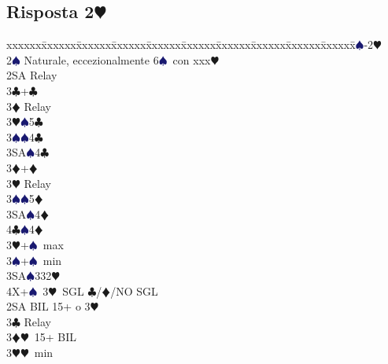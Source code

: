 \documentclass[a4paper,italian]{article}
\newcommand{\BC}{\textcolor{OliveGreen}{$\clubsuit$}}
\newcommand{\BD}{\textcolor{RedOrange}{$\vardiamondsuit$}}
\newcommand{\BH}{\textcolor{Red2}{$\varheartsuit${}}}
\newcommand{\BS}{\textcolor{MidnightBlue}{$\spadesuit${}}}
\newcommand{\pdfh}{\texorpdfstring{\BH{}}{H}}
\newenvironment{bidtable}
{\begin{tabbing}

    xxxxxx\=xxxxxx\=xxxxxx\=xxxxxx\=xxxxxx\=xxxxxx\=xxxxxx\=xxxxxx\=xxxxxx\=xxxxxx\=\kill}
{\end{tabbing} }%
\begin{document}
                                    \begin{multicols}{2}
                                        \subsection{Risposta 2\pdfh}
                                        \begin{bidtable}
                                            1\BS-2\BH\\
                                            2\BS\> Naturale, eccezionalmente 6\BS\ con xxx\BH\+\\
                                            2SA \> Relay\+\\
                                            3\BC{}+\BC\+\\
                                            3\BD\> Relay\+\\
                                            3\BH{}\BS5\BC\\
                                            3\BS{}\BS4\BC\\
                                            3SA\BS4\BC\-\-\\
                                            3\BD{}+\BD\+\\
                                            3\BH\> Relay\+\\
                                            3\BS{}\BS5\BD\\
                                            3SA\BS4\BD\\
                                            4\BC{}\BS4\BD\-\-\\
                                            3\BH{}+\BS\ max\\
                                            3\BS{}+\BS\ min\\
                                            3SA\BS332\BH\\
                                            4X+\BS\ 3\BH\ SGL \BC/\BD/NO SGL\-\-\\
                                            2SA\> BIL 15+ o 3\BH\+\\
                                            3\BC\> Relay\+\\
                                            3\BD{}\BH\ 15+ BIL\\
                                            3\BH{}\BH\ min\+\\

\end{bidtable}
\end{multicols}
\end{document}
